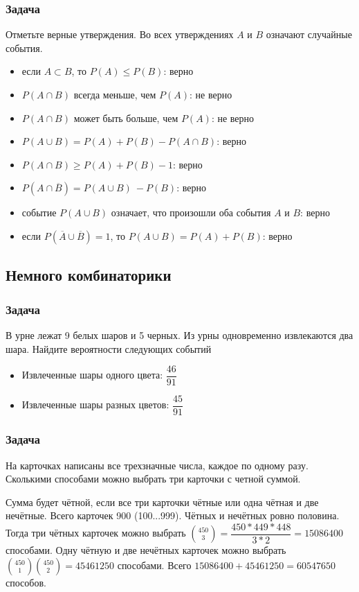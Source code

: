 \documentclass[a4paper,12pt]{article}
\begin{document}
\subsubsection*{Задача}
Отметьте верные утверждения. Во всех утверждениях \(A\) и \(B\) означают случайные события.
\begin{itemize}
	\item если \(A \subset B\), то \(P(A) \leqslant P(B)\): верно
	\item \(P(A \cap B)\) всегда меньше, чем \(P(A)\): не верно
	\item \(P(A \cap B)\) может быть больше, чем \(P(A)\): не верно
	\item \(P(A \cup B)=P(A)+P(B)-P(A\cap B)\): верно
	\item \(P(A \cap B) \geqslant P(A)+P(B)-1\): верно
	\item \(P(A \cap \overline{B}) = P(A \cup B)\ - P(B)\): верно
	\item событие \(P(A \cup B)\) означает, что произошли оба события \(A\) и \(B\):  верно
	\item если \(P(\overline{A} \cup \overline{B})=1\), то \(P(A \cup B) = P(A)+P(B)\):  верно
\end{itemize}


\subsection{Немного комбинаторики}
\subsubsection*{Задача}
В урне лежат 9 белых шаров и 5 черных. Из урны одновременно извлекаются два шара. Найдите вероятности следующих событий
\begin{itemize}
	\item Извлеченные шары одного цвета: \(\dfrac{46}{91}\)
	\item Извлеченные шары разных цветов: \(\dfrac{45}{91}\)
\end{itemize}

\subsubsection*{Задача}
На карточках написаны все трехзначные числа, каждое по одному разу. Сколькими способами можно выбрать три карточки с четной суммой.

Сумма будет чётной, если все три карточки чётные или одна чётная и две нечётные. Всего карточек 900 (100...999). Чётных и нечётных ровно половина. Тогда три чётных карточек можно выбрать \(\binom{450}{3}=\dfrac{450*449*448}{3*2} = 15086400\) способами. Одну чётную и две нечётных  карточек можно выбрать \(\binom{450}{1}\binom{450}{2}=45461250\) способами. Всего \(15086400+45461250=60547650\) способов.
\end{document}

